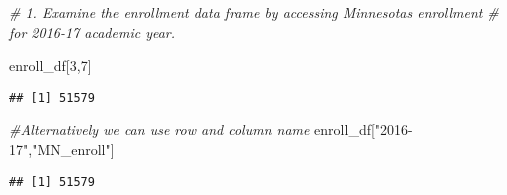 \documentclass[
]{article}
\newenvironment{Shaded}{\begin{snugshade}}{\end{snugshade}}
\newcommand{\CommentTok}[1]{\textcolor[rgb]{0.56,0.35,0.01}{\textit{#1}}}
\newcommand{\DecValTok}[1]{\textcolor[rgb]{0.00,0.00,0.81}{#1}}
\newcommand{\NormalTok}[1]{#1}
\newcommand{\StringTok}[1]{\textcolor[rgb]{0.31,0.60,0.02}{#1}}
\begin{document}
\begin{Shaded}
\begin{Highlighting}[]
\CommentTok{\# 1. Examine the enrollment data frame by accessing Minnesota\textquotesingle{}s enrollment }
\CommentTok{\# for 2016{-}17 academic year.}

\NormalTok{enroll\_df[}\DecValTok{3}\NormalTok{,}\DecValTok{7}\NormalTok{] }
\end{Highlighting}
\end{Shaded}

\begin{verbatim}
## [1] 51579
\end{verbatim}

\begin{Shaded}
\begin{Highlighting}[]
\CommentTok{\#Alternatively we can use row and column name }
\NormalTok{enroll\_df[}\StringTok{"2016{-}17"}\NormalTok{,}\StringTok{"MN\_enroll"}\NormalTok{]}
\end{Highlighting}
\end{Shaded}

\begin{verbatim}
## [1] 51579
\end{verbatim}
\end{document}
